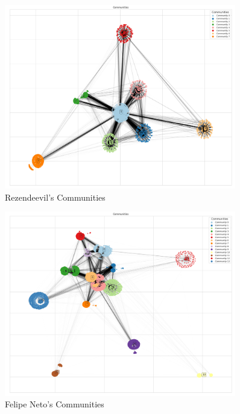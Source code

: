 \documentclass[12pt]{article}
\begin{document}
\begin{figure}[t]
    \centering
    \includegraphics[keepaspectratio,width=0.9\textwidth]{./imgs/rezendeevil/communities.png}
    \caption[width=\textwidth]{Rezendeevil's Communities}
    \label{fig:rezendeevil_comm}
\end{figure}

\begin{figure}[t]
    \centering
    \includegraphics[keepaspectratio,width=0.9\textwidth]{./imgs/felipeneto/communities.png}
    \caption[width=\textwidth]{Felipe Neto's Communities}
    \label{fig:felipeneto_comm}
\end{figure}
\end{document}
